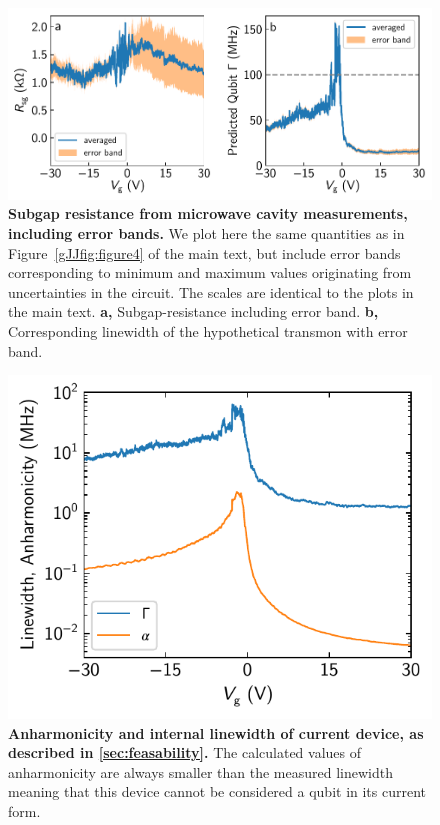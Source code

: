 \begin{figure}[]
	\centering
	\includegraphics[width=\linewidth]{chapter-gJJ/figs/fig4_supp_bands}
	\caption[]{\textbf{Subgap resistance from microwave cavity measurements, including error bands.}
		We plot here the same quantities as in Figure~\ref{gJJfig:figure4} of the main text, but include error bands corresponding to minimum and maximum values originating from uncertainties in the circuit.
		The scales are identical to the plots in the main text.
		\textbf{a,} Subgap-resistance including error band.
		\textbf{b,} Corresponding linewidth of the hypothetical transmon with error band.
	}
	\label{gJJfig:figure4_bands}
\end{figure}

\begin{figure}[]
	\centering
	\includegraphics[width=.7\linewidth]{chapter-gJJ/figs/supp_anharmonicity_1.pdf}
	\caption{{\bf Anharmonicity and internal linewidth of current device, as described in \ref{sec:feasability}.}
		The calculated values of anharmonicity are always smaller than the measured linewidth meaning that this device cannot be considered a qubit in its current form.}
	\label{gJJfig:anharm1}
\end{figure}


